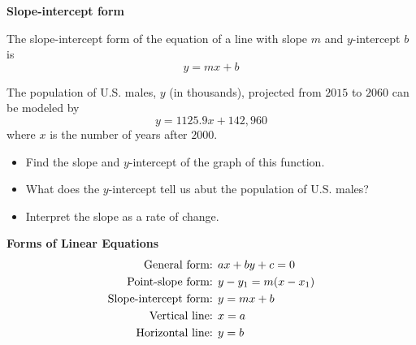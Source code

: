 \documentclass[../mathNotesPreamble]{subfiles}
\begin{document}
    \noindent\textbf{Slope-intercept form}
    \begin{defn*}
      The slope-intercept form of the equation of a line with slope $m$ and $y$-intercept $b$ is
        \[y=mx+b\]
    \end{defn*}
    \begin{ex*}[Example 7, p.82]
      The population of U.S. males, $y$ (in thousands), projected from $2015$ to $2060$ can be modeled by
        \[y=1125.9x+142,960\]
      where $x$ is the number of years after $2000$.
      \begin{itemize}
        \item Find the slope and $y$-intercept of the graph of this function.
        \item What does the $y$-intercept tell us abut the population of U.S. males?
        \item Interpret the slope as a rate of change.
      \end{itemize}
    \end{ex*}
    \pagebreak

    \textbf{Forms of Linear Equations}\\
      \begin{align*}
        \textnormal{General form: }& ax+by+c=0\\
        \textnormal{Point-slope form: }& y-y_1=m(x-x_1)\\
        \textnormal{Slope-intercept form: }& y=mx+b\\
        \textnormal{Vertical line: }& x=a\\
        \textnormal{Horizontal line: }& y=b
      \end{align*}
    \pagebreak
\end{document}
